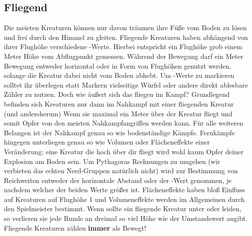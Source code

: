 \subsection*{Fliegend} \label{ef:fliegend}
Die meisten Kreaturen können nur davon träumen ihre Füße vom Boden zu lösen und frei durch den Himmel zu gleiten. Fliegende Kreaturen haben abhängend von ihrer Flughöhe verschiedene \textit{}-Werte. Hierbei entspricht ein Flughöhe grob einem Meter Höhe vom Abflugpunkt gemessen. Während der Bewegung darf ein Meter Bewegung entweder horizontal oder in Form von Flughöhen genutzt werden, solange die Kreatur dabei nicht vom Boden abhebt. Um \textit{}-Werte zu markieren solltet ihr überlegen statt Markern vielseitige Würfel oder andere direkt ablesbare Zähler zu nutzen. Doch wie äußert sich das fliegen im Kampf? Grundlegend befinden sich Kreaturen nur dann im Nahkampf mit einer fliegenden Kreatur (und andersherum) Wenn sie maximal ein Meter über der Kreatur fliegt und somit Opfer von den meisten Nahkampfangriffen werden kann. Für alle weiteren Belangen ist der Nahkampf genau so wie bodenständige Kämpfe. Fernkämpfe hingegen unterliegen genau so wie Volumen oder Flächeneffekte einer Veränderung: eine Kreatur die hoch über dir fliegt wird wohl kaum Opfer deiner Explosion am Boden sein. Um Pythagoras Rechnungen zu umgehen (wir verbieten das echten Nerd-Gruppen natürlich nicht) wird zur Bestimmung von Reichweiten entweder der horizontale Abstand oder der \textit{}-Wert genommen, je nachdem welcher der beiden Werte größer ist. Flächeneffekte haben bloß Einfluss auf Kreaturen auf Flughöhe 1 und Volumeneffekte werden im Allgemeinen durch den Spielmeister bestimmt. Wenn sollte ein fliegende Kreatur unter \textit{} oder \textit{} leiden, so verlieren sie jede Runde an dreimal so viel Höhe wie der Umstandswert angibt.\\
Fliegende Kreaturen zählen \textbf{immer} als Bewegt!




